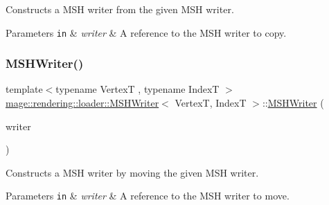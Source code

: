 Constructs a M\+SH writer from the given M\+SH writer.


\begin{DoxyParams}[1]{Parameters}
\mbox{\tt in}  & {\em writer} & A reference to the M\+SH writer to copy. \\
\hline
\end{DoxyParams}
\hypertarget{classmage_1_1rendering_1_1loader_1_1_m_s_h_writer_a877a042ef1a4472c9d1cece846b2a70a}{}\label{classmage_1_1rendering_1_1loader_1_1_m_s_h_writer_a877a042ef1a4472c9d1cece846b2a70a} 
\subsubsection{\texorpdfstring{M\+S\+H\+Writer()}{MSHWriter()}\hspace{0.1cm}{\footnotesize\ttfamily [3/3]}}
{\footnotesize\ttfamily template$<$typename VertexT , typename IndexT $>$ \\
\hyperlink{classmage_1_1rendering_1_1loader_1_1_m_s_h_writer}{mage\+::rendering\+::loader\+::\+M\+S\+H\+Writer}$<$ VertexT, IndexT $>$\+::\hyperlink{classmage_1_1rendering_1_1loader_1_1_m_s_h_writer}{M\+S\+H\+Writer} (\begin{DoxyParamCaption}\item[{\hyperlink{classmage_1_1rendering_1_1loader_1_1_m_s_h_writer}{M\+S\+H\+Writer}$<$ VertexT, IndexT $>$ \&\&}]{writer }\end{DoxyParamCaption})\hspace{0.3cm}{\ttfamily [noexcept]}}

Constructs a M\+SH writer by moving the given M\+SH writer.


\begin{DoxyParams}[1]{Parameters}
\mbox{\tt in}  & {\em writer} & A reference to the M\+SH writer to move. \\
\hline
\end{DoxyParams}
\hypertarget{classmage_1_1rendering_1_1loader_1_1_m_s_h_writer_ae2ead8892a1818c59d55a7a5ecdf50b3}{}\label{classmage_1_1rendering_1_1loader_1_1_m_s_h_writer_ae2ead8892a1818c59d55a7a5ecdf50b3} 
